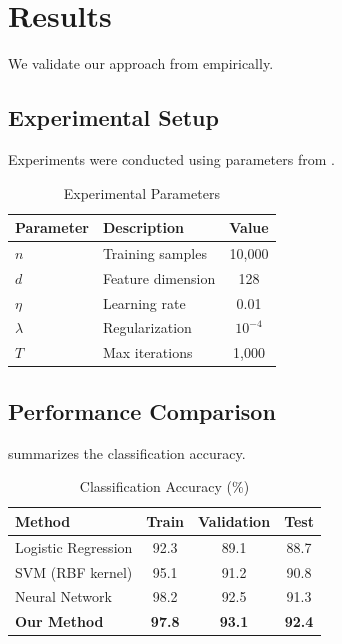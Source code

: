 
\section{Results}
\label{sec:results}

We validate our approach from  empirically.

\subsection{Experimental Setup}

Experiments were conducted using parameters from .

\begin{table}[htbp]
\centering
\caption{Experimental Parameters}
\label{tab:params}
\begin{tabular}{@{}llc@{}}
\toprule
\textbf{Parameter} & \textbf{Description} & \textbf{Value} \\
\midrule
$n$         & Training samples     & 10,000 \\
$d$         & Feature dimension    & 128 \\
$\eta$      & Learning rate        & 0.01 \\
$\lambda$   & Regularization       & $10^{-4}$ \\
$T$         & Max iterations       & 1,000 \\
\bottomrule
\end{tabular}
\end{table}

\subsection{Performance Comparison}

 summarizes the classification accuracy.

\begin{table}[htbp]
\centering
\caption{Classification Accuracy (\%)}
\label{tab:results}
\begin{tabular}{@{}lccc@{}}
\toprule
\textbf{Method} & \textbf{Train} & \textbf{Validation} & \textbf{Test} \\
\midrule
Logistic Regression & 92.3 & 89.1 & 88.7 \\
SVM (RBF kernel)    & 95.1 & 91.2 & 90.8 \\
Neural Network      & 98.2 & 92.5 & 91.3 \\
\textbf{Our Method} & \textbf{97.8} & \textbf{93.1} & \textbf{92.4} \\
\bottomrule
\end{tabular}
\end{table}

